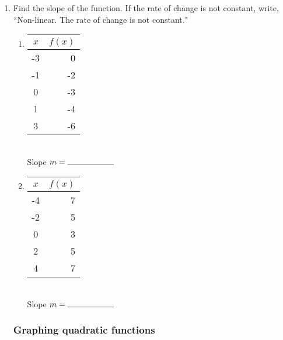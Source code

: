 \documentclass[12pt, twoside]{article}
\begin{document}
\begin{enumerate}
  \item Find the slope of the function. If the rate of change is not constant, write, ``Non-linear. The rate of change is not constant."

    \begin{multicols}{2}
    \begin{enumerate}
      \item
        \begin{tabular}{|c|r|}
          \hline
          $x$ & $f(x)$\\
          \hline
          -3 & 0 \\
          \hline
          -1 & -2 \\
          \hline
          0 & -3 \\
          \hline
          1 & -4 \\
          \hline
          3 & -6 \\
          \hline
        \end{tabular}\\[0.85cm]

        Slope $m= \rule{2cm}{0.15mm}$\\


      \item
        \begin{tabular}{|c|r|}
          \hline
          $x$ & $f(x)$\\
          \hline
          -4 & 7 \\
          \hline
          -2 & 5 \\
          \hline
          0 & 3 \\
          \hline
          2 & 5 \\
          \hline
          4 & 7 \\
          \hline
        \end{tabular}\\[0.85cm]

        Slope $m= \rule{2cm}{0.15mm}$\\

      \end{enumerate}
    \end{multicols}

    \newpage
          \subsubsection*{Graphing quadratic functions}


\end{enumerate}
\end{document}
